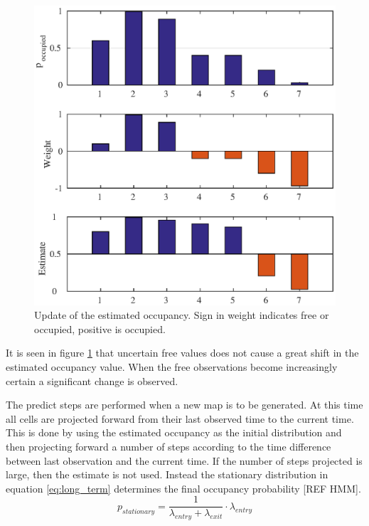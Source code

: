 \begin{figure}[htbp]
	\centering
	\includegraphics[width=1\linewidth]{chapters/cost_interpretation/figures/update}
	\caption{Update of the estimated occupancy. Sign in weight indicates free or occupied, positive is occupied. }
	\label{fig:cost_update}
\end{figure}

It is seen in figure \ref{fig:cost_update} that uncertain free values does not cause a great shift in the estimated occupancy value. When the free observations become increasingly certain a significant change is observed. 

The predict steps are performed when a new map is to be generated. At this time all cells are projected forward from their last observed time to the current time. This is done by using the estimated occupancy as the initial distribution and then projecting forward a number of steps according to the time difference between last observation and the current time. If the number of steps projected is large, then the estimate is not used. Instead the stationary distribution in  equation \ref{eq:long_term}  determines the final occupancy probability [REF HMM].
\begin{equation}
	\label{eq:long_term}
	p_{stationary} = \frac{1}{\lambda_{entry} + \lambda_{exit}} \cdot \lambda_{entry}
\end{equation}

